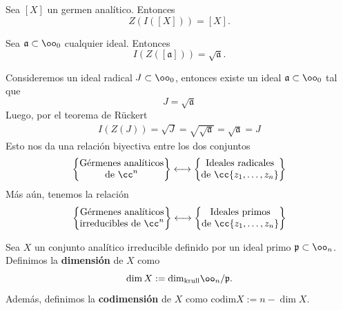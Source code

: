 	\begin{propo}
		Sea $[X]$ un germen analítico. Entonces
		\begin{equation*}
			Z(I([X]))=[X].
		\end{equation*}
	\end{propo}
	
	\begin{theorem}[de Rückert]
		Sea $\mathfrak{a}\subset\oo_0$ cualquier ideal. Entonces
		\begin{equation*}
				I(Z([\mathfrak{a}]))=\sqrt{\mathfrak{a}}.
		\end{equation*}
	\end{theorem}
	
	\begin{remark}
		Consideremos un ideal radical $J\subset\oo_0$, entonces existe un ideal $\mathfrak{a}\subset\oo_0$ tal que
		\begin{equation*}
			J=\sqrt{\mathfrak{a}}
		\end{equation*}
		Luego, por el teorema de Rückert
		\begin{align*}
			I(Z(J))=\sqrt{J}=\sqrt{\sqrt{\mathfrak{a}}}=\sqrt{\mathfrak{a}}=J
		\end{align*}
		Esto nos da una relación biyectiva entre los dos conjuntos
		\begin{align*}
			\begin{Bmatrix}
				\text{Gérmenes analíticos}\\
				\text{de }\cc^n
			\end{Bmatrix}\longleftrightarrow\begin{Bmatrix}
				\text{Ideales radicales}\\
				\text{de }\cc\{z_1,\dots,z_n\}
			\end{Bmatrix}
		\end{align*}
		Más aún, tenemos la relación
		\begin{align*}
			\begin{Bmatrix}
				\text{Gérmenes analíticos}\\
				\text{irreducibles de }\cc^n
			\end{Bmatrix}\longleftrightarrow\begin{Bmatrix}
				\text{Ideales primos}\\
				\text{de }\cc\{z_1,\dots,z_n\}
			\end{Bmatrix}
		\end{align*}
	\end{remark}
	
	\begin{definition}
		Sea $X$ un conjunto analítico irreducible definido por un ideal primo $\mathfrak{p}\subset\oo_n$. Definimos la \textbf{dimensión} de $X$ como
		\begin{equation*}
			\dim X:=\mathrm{dim}_{\text{krull}}\oo_n/\mathfrak{p}.
		\end{equation*}
		Además, definimos la \textbf{codimensión} de $X$ como $\mathrm{codim}X:=n-\dim X$.
	\end{definition}
	
